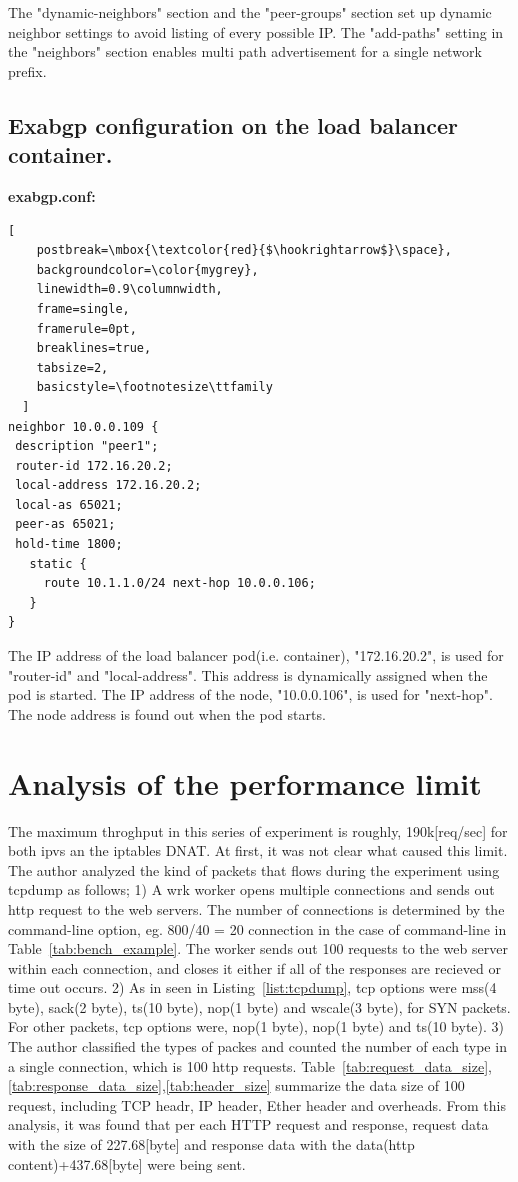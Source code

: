 The "dynamic-neighbors" section and the "peer-groups" section set up dynamic neighbor settings to avoid listing of every possible IP. 
The "add-paths" setting in the "neighbors" section enables multi path advertisement for a single network prefix.

\section{Exabgp configuration on the load balancer container.}
\label{appendix:exabgp_config}

{\bf\normalsize exabgp.conf:}

\begin{lstlisting}[
    postbreak=\mbox{\textcolor{red}{$\hookrightarrow$}\space},
    backgroundcolor=\color{mygrey},
    linewidth=0.9\columnwidth,
    frame=single,
    framerule=0pt,
    breaklines=true,
    tabsize=2,
    basicstyle=\footnotesize\ttfamily
  ]
neighbor 10.0.0.109 {
 description "peer1";
 router-id 172.16.20.2;
 local-address 172.16.20.2;
 local-as 65021;
 peer-as 65021;
 hold-time 1800;
   static {
     route 10.1.1.0/24 next-hop 10.0.0.106;
   }
}
\end{lstlisting}

The IP address of the load balancer pod(i.e. container), "172.16.20.2", is used for "router-id" and "local-address".
This address is dynamically assigned when the pod is started.
The IP address of the node, "10.0.0.106", is used for "next-hop".
The node address is found out when the pod starts.

\chapter{Analysis of the performance limit}
\label{appendix:performance_limit}

The maximum throghput in this series of experiment is roughly, 190k[req/sec] for both ipvs an the iptables DNAT.
At first, it was not clear what caused this limit.
The author analyzed the kind of packets that flows during the experiment using tcpdump\cite{jacobson1989tcpdump} as follows;
1) A wrk worker opens multiple connections and sends out http request to the web servers. The number of connections is determined by the command-line option, eg. 800/40 = 20 connection in the case of command-line in Table~\ref{tab:bench_example}. The worker sends out 100 requests to the web server within each connection, and closes it either if all of the responses are recieved or time out occurs.
2) As in seen in Listing~\ref{list:tcpdump}, tcp options were mss(4 byte), sack(2 byte), ts(10 byte), nop(1 byte) and wscale(3 byte), for SYN packets. For other packets, tcp options were, nop(1 byte), nop(1 byte) and ts(10 byte).
3) The author classified the types of packes and counted the number of each type in a single connection, which is 100 http requests. Table~\ref{tab:request_data_size},\ref{tab:response_data_size},\ref{tab:header_size} summarize the data size of 100 request, including TCP headr, IP header, Ether header and overheads. 
From this analysis, it was found that per each HTTP request and response,
request data with the size of 227.68[byte] and response data with the data(http content)+437.68[byte] were being sent.   

